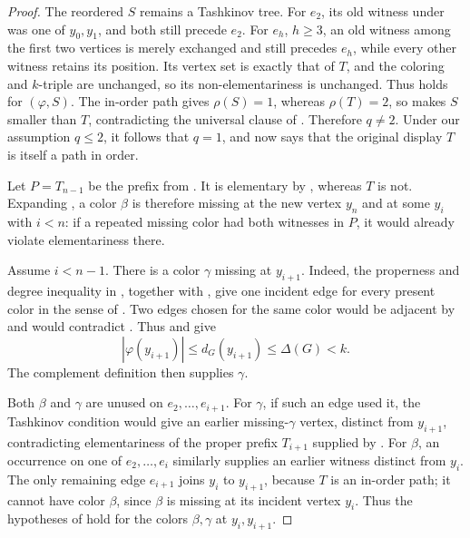 \begin{proof}
The reordered \(S\) remains a Tashkinov tree.  For \(e_2\), its old
witness under  was one of \(y_0,y_1\), and both
still precede \(e_2\).  For \(e_h\), \(h\ge3\), an old witness among the
first two vertices is merely exchanged and still precedes \(e_h\), while
every other witness retains its position.  Its vertex set is exactly that
of \(T\), and the coloring and \(k\)-triple are unchanged, so its
non-elementariness is unchanged.  Thus  holds
for \((\varphi,S)\).  The in-order path gives \(\rho(S)=1\), whereas
\(\rho(T)=2\), so  makes \(S\) smaller than
\(T\), contradicting the universal clause of
.  Therefore \(q\ne2\).  Under our
assumption \(q\le2\), it follows that \(q=1\), and
 now says that the original display \(T\) is
itself a path in order.

Let \(P=T_{n-1}\) be the prefix from .
It is elementary by , whereas
\(T\) is not.  Expanding , a color
\(\beta\) is therefore missing at the new vertex \(y_n\) and at some
\(y_i\) with \(i<n\): if a repeated missing color had both witnesses in
\(P\), it would already violate elementariness there.

Assume \(i<n-1\).  There is a color \(\gamma\) missing at \(y_{i+1}\).
Indeed, the properness and degree inequality in , together
with , give one incident edge for every present
color in the sense of .  Two edges chosen for the same
color would be adjacent by  and would contradict
.  Thus  and
 give
\[
 |\varphi(y_{i+1})|\le d_G(y_{i+1})\le\Delta(G)<k.
\]
The complement definition  then supplies
\(\gamma\).

Both \(\beta\) and \(\gamma\) are unused on
\(e_2,\ldots,e_{i+1}\).  For \(\gamma\), if such an edge used it, the
Tashkinov condition  would give an earlier
missing-\(\gamma\) vertex, distinct from \(y_{i+1}\), contradicting
elementariness of the proper prefix \(T_{i+1}\) supplied by
.  For \(\beta\), an occurrence
on one of \(e_2,\ldots,e_i\) similarly supplies an earlier witness
distinct from \(y_i\).  The only remaining edge \(e_{i+1}\) joins
\(y_i\) to \(y_{i+1}\), because \(T\) is an in-order path; it cannot have
color \(\beta\), since \(\beta\) is missing at its incident vertex
\(y_i\).  Thus the hypotheses of
 hold for the colors
\(\beta,\gamma\) at \(y_i,y_{i+1}\).


\end{proof}
